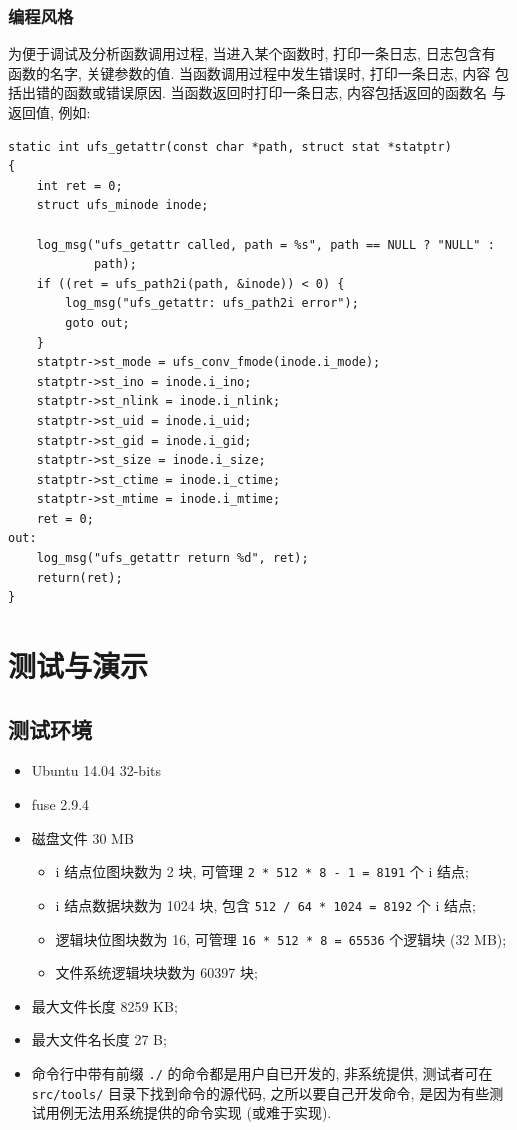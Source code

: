 \documentclass[nofonts, titlepage]{ctexart}
\begin{document}
\subsubsection{编程风格}
为便于调试及分析函数调用过程, 当进入某个函数时, 打印一条日志, 日志包含有
函数的名字, 关键参数的值. 当函数调用过程中发生错误时, 打印一条日志, 内容
包括出错的函数或错误原因. 当函数返回时打印一条日志, 内容包括返回的函数名
与返回值, 例如:
\begin{verbatim}
static int ufs_getattr(const char *path, struct stat *statptr)
{
    int ret = 0;
    struct ufs_minode inode;

    log_msg("ufs_getattr called, path = %s", path == NULL ? "NULL" :
            path);
    if ((ret = ufs_path2i(path, &inode)) < 0) {
        log_msg("ufs_getattr: ufs_path2i error");
        goto out;
    }
    statptr->st_mode = ufs_conv_fmode(inode.i_mode);
    statptr->st_ino = inode.i_ino;
    statptr->st_nlink = inode.i_nlink;
    statptr->st_uid = inode.i_uid;
    statptr->st_gid = inode.i_gid;
    statptr->st_size = inode.i_size;
    statptr->st_ctime = inode.i_ctime;
    statptr->st_mtime = inode.i_mtime;
    ret = 0;
out:
    log_msg("ufs_getattr return %d", ret);
    return(ret);
}
\end{verbatim}
\section{测试与演示}\label{ux6d4bux8bd5ux4e0eux6f14ux793a}

\subsection{测试环境}\label{ux6d4bux8bd5ux73afux5883}

\begin{itemize}
\item
  Ubuntu 14.04 32-bits
\item
  fuse 2.9.4
\item
  磁盘文件 30 MB

  \begin{itemize}
  \item
    i 结点位图块数为 2 块, 可管理 \texttt{2 * 512 * 8 - 1 = 8191} 个 i
    结点;
  \item
    i 结点数据块数为 1024 块, 包含 \texttt{512 / 64 * 1024 = 8192} 个 i
    结点;
  \item
    逻辑块位图块数为 16, 可管理 \texttt{16 * 512 * 8 = 65536} 个逻辑块
    (32 MB);
  \item
    文件系统逻辑块块数为 60397 块;
  \end{itemize}
\item
  最大文件长度 8259 KB;
\item
  最大文件名长度 27 B;
\item
  命令行中带有前缀 \texttt{./} 的命令都是用户自已开发的, 非系统提供,
  测试者可在 \texttt{src/tools/} 目录下找到命令的源代码, 之所以要自己开发命令,
  是因为有些测试用例无法用系统提供的命令实现 (或难于实现).
\end{itemize}
\end{document}

